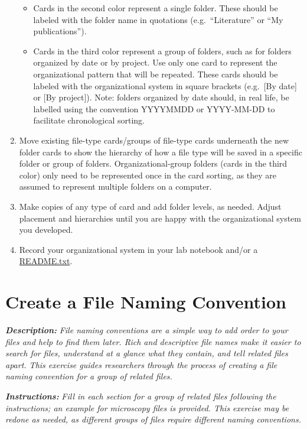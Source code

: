 \documentclass[
]{book}
\providecommand{\tightlist}{%
  \setlength{\itemsep}{0pt}\setlength{\parskip}{0pt}}
\begin{document}
\begin{enumerate}
  \begin{itemize}
  \tightlist
  \item
    Cards in the second color represent a single folder. These should be labeled with the folder name in quotations (e.g.~``Literature'' or ``My publications'').
  \item
    Cards in the third color represent a group of folders, such as for folders organized by date or by project. Use only one card to represent the organizational pattern that will be repeated. These cards should be labeled with the organizational system in square brackets (e.g.~{[}By date{]} or {[}By project{]}). Note: folders organized by date should, in real life, be labelled using the convention YYYYMMDD or YYYY-MM-DD to facilitate chronological sorting.
  \end{itemize}
\item
  Move existing file-type cards/groups of file-type cards underneath the new folder cards to show the hierarchy of how a file type will be saved in a specific folder or group of folders. Organizational-group folders (cards in the third color) only need to be represented once in the card sorting, as they are assumed to represent multiple folders on a computer.
\item
  Make copies of any type of card and add folder levels, as needed. Adjust placement and hierarchies until you are happy with the organizational system you developed.
\item
  Record your organizational system in your lab notebook and/or a \protect\hyperlink{readme-txt}{README.txt}.
\end{enumerate}

\newpage

\hypertarget{file-naming}{%
\section{Create a File Naming Convention}\label{file-naming}}

\textbf{\emph{Description:}} \emph{File naming conventions are a simple way to add order to your files and help to find them later. Rich and descriptive file names make it easier to search for files, understand at a glance what they contain, and tell related files apart. This exercise guides researchers through the process of creating a file naming convention for a group of related files.}

\textbf{\emph{Instructions:}} \emph{Fill in each section for a group of related files following the instructions; an example for microscopy files is provided. This exercise may be redone as needed, as different groups of files require different naming conventions.}
\end{document}
